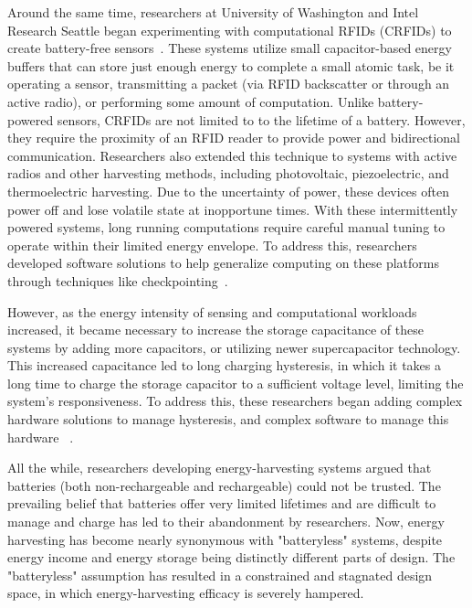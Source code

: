Around the same time, researchers at University of Washington and Intel Research Seattle began experimenting with computational RFIDs (CRFIDs) to create battery-free sensors~\cite{sample2008design}. 
These systems utilize small capacitor-based energy buffers that can store just enough energy to complete a small atomic task, be it operating a sensor, transmitting a packet (via RFID backscatter or through an active radio), or performing some amount of computation. 
Unlike battery-powered sensors, CRFIDs are not limited to to the lifetime of a battery. However, they require the proximity of an RFID reader to provide power and bidirectional communication. Researchers also extended this technique to systems with active radios and other harvesting methods, including photovoltaic, piezoelectric, and thermoelectric harvesting. Due to the uncertainty of power, these devices often power off and lose volatile state at inopportune times. With these intermittently powered systems, long running computations require careful manual tuning to operate within their limited energy envelope. To address this, researchers developed software solutions to help generalize computing on these platforms through techniques like checkpointing~\cite{ransford2012mementos}.

However, as the energy intensity of sensing and computational workloads increased, it became necessary to increase the storage capacitance of these systems by adding more capacitors, or utilizing newer supercapacitor technology. 
This increased capacitance led to long charging hysteresis, in which it takes a long time to charge the storage capacitor to a sufficient voltage level, limiting the system's responsiveness.
To address this,
these researchers began adding complex hardware solutions to manage hysteresis, and complex software to manage this hardware 
~\cite{colinReconfigurable18,hesterFlicker17}.

All the while, researchers developing energy-harvesting systems argued that batteries (both non-rechargeable and rechargeable) could not be trusted. The prevailing belief that batteries offer very limited lifetimes and are difficult to manage and charge has led to their abandonment by researchers. 
Now, energy harvesting has become nearly synonymous with "batteryless" systems, despite energy income and energy storage being distinctly different parts of design.
The "batteryless" assumption has resulted in a constrained and stagnated design space, in which energy-harvesting efficacy is severely hampered.

